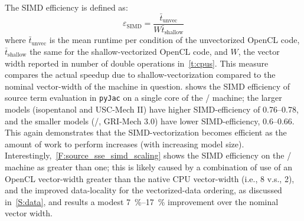 \documentclass[12pt,number,sort&compress,preprint]{elsarticle}
\begin{document}
The SIMD efficiency is defined as:
\begin{equation}
 \label{e:simd_efficiency}
 \varepsilon_{\text{SIMD}} = \frac{\bar{t}_{\text{unvec}}}{W \bar{t}_{\text{shallow}}}
\end{equation}
where $\bar{t}_{\text{unvec}}$ is the mean runtime per condition of the unvectorized OpenCL code, $\bar{t}_{\text{shallow}}$ the same for the shallow-vectorized OpenCL code, and $W$, the vector width reported in number of double operations in~\cref{t:cpus}.
This measure compares the actual speedup due to shallow-vectorization compared to the nominal vector-width of the machine in question.
 shows the SIMD efficiency of source term evaluation in \texttt{pyJac} on a single core of the \avx/ machine; the larger models (isopentanol and USC-Mech II) have higher SIMD-efficiency of \numrange{0.76}{0.78}, and the smaller models (\slash{}, GRI-Mech \num{3.0}) have lower SIMD-efficiency, \numrange{0.6}{0.66}.
This again demonstrates that the SIMD-vectorization becomes efficient as the amount of work to perform increases (with increasing model size).
Interestingly,~\cref{F:source_sse_simd_scaling} shows the SIMD efficiency on the \sse/ machine as greater than one; this is likely caused by a combination of use of an OpenCL vector-width greater than the native CPU vector-width (i.e., \num{8} v.s., \num{2}), and the improved data-locality for the vectorized-data ordering, as discussed in~\cref{S:data}, and results a modest \SIrange{7}{17}{\percent} improvement over the nominal vector width.
\end{document}
